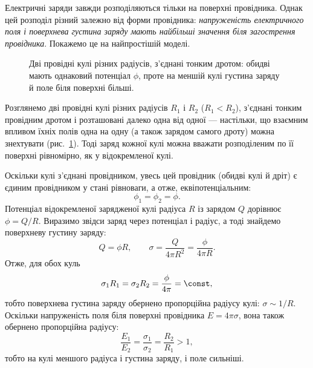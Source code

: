 
Електричні заряди завжди розподіляються тільки на поверхні провідника. Однак цей розподіл різний залежно від форми провідника: \emph{напруженість
    електричного поля і поверхнева густина заряду мають найбільші значення біля загострення провідника}. Покажемо це на найпростішій моделі.

\begin{figure}[h!]
    \centering
    \caption{Дві провідні кулі різних радіусів, з'єднані тонким дротом: обидві мають однаковий потенціал $\phi$, проте на меншій кулі густина заряду й поле біля поверхні більші.\label{tikz:two_spheres_wire}}
\end{figure}

Розглянемо дві провідні кулі різних радіусів $R_1$ і $R_2$ ($R_1 < R_2$), з'єднані тонким провідним дротом і розташовані далеко одна від одної --- настільки, що взаємним впливом їхніх полів одна на одну (а також зарядом самого дроту) можна знехтувати (рис.~\ref{tikz:two_spheres_wire}). Тоді заряд кожної кулі можна вважати розподіленим по її поверхні рівномірно, як у відокремленої кулі.

Оскільки кулі з'єднані провідником, увесь цей провідник (обидві кулі й дріт) є єдиним провідником у стані рівноваги, а отже, еквіпотенціальним:
\begin{equation*}
    \phi_1 = \phi_2 = \phi.
\end{equation*}
Потенціал відокремленої зарядженої кулі радіуса $R$ із зарядом $Q$ дорівнює $\phi = Q/R$. Виразимо звідси заряд через потенціал і радіус, а тоді знайдемо поверхневу густину заряду:
\begin{equation*}
    Q = \phi R, \qquad \sigma = \frac{Q}{4\pi R^2} = \frac{\phi}{4\pi R}.
\end{equation*}
Отже, для обох куль
\begin{equation*}
    \sigma_1 R_1 = \sigma_2 R_2 = \frac{\phi}{4\pi} = \const,
\end{equation*}
тобто поверхнева густина заряду обернено пропорційна радіусу кулі: $\sigma \sim 1/R$. Оскільки напруженість поля біля поверхні провідника $E = 4\pi\sigma$, вона також обернено пропорційна радіусу:
\begin{equation*}
    \frac{E_1}{E_2} = \frac{\sigma_1}{\sigma_2} = \frac{R_2}{R_1} > 1,
\end{equation*}
тобто на кулі меншого радіуса і густина заряду, і поле сильніші.

